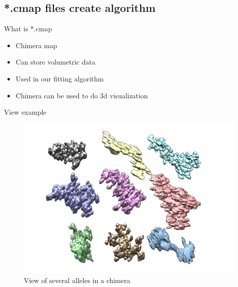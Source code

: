 \documentclass[10pt,usenames,dvipsnames]{beamer}
\begin{document}
\subsection{*.cmap files create algorithm}
\begin{frame}[c]{What is *.cmap}
  \begin{itemize}
    \item Chimera map
    \item Can store volumetric data
    \item Used in our fitting algorithm
    \item Chimera can be used to do 3d visualization  
  \end{itemize}
\end{frame}
\begin{frame}[c]{View example}
  \begin{figure}[htpb]
    \centering
    \includegraphics[width=0.8\linewidth]{gallery}
    \caption{View of several alleles in a chimera}
    \label{fig:}
  \end{figure}  
\end{frame}
\end{document}
